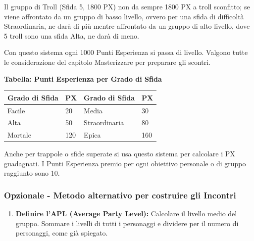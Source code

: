 \begin{multicols}{2}
Il gruppo di Troll (Sfida 5, 1800 PX) non da sempre 1800 PX a troll sconfitto; se viene affrontato da un gruppo di basso livello, ovvero per una sfida di difficoltà Straordinaria, ne darà di più mentre affrontato da un gruppo di alto livello, dove 5 troll sono una sfida Alta, ne darà di meno.

Con questo sistema ogni 1000 Punti Esperienza si passa di livello. Valgono tutte le considerazione del capitolo Masterizzare per preparare gli scontri.

\medskip

\textbf{Tabella: Punti Esperienza per Grado di Sfida}

\begin{tabular}{ll|ll}
\textbf{Grado di Sfida} & \textbf{PX}&\textbf{Grado di Sfida} & \textbf{PX}\\
\toprule
Facile& 20& Media& 30\\
Alta& 50& Straordinaria& 80\\
Mortale& 120& Epica& 160
\end{tabular}

\medskip

Anche per trappole o sfide superate si usa questo sistema per calcolare i PX guadagnati. I Punti Esperienza premio per ogni obiettivo personale o di gruppo raggiunto sono 10.

\subsubsection{Opzionale - Metodo alternativo per costruire gli Incontri}

\begin{enumerate}[leftmargin=*] \setlength{\itemsep}{0pt}

\item \textbf{Definire l'APL (Average Party Level):} Calcolare il livello medio del gruppo. Sommare i livelli di tutti i personaggi e dividere per il numero di personaggi, come già spiegato.



\end{enumerate}
\end{multicols}
